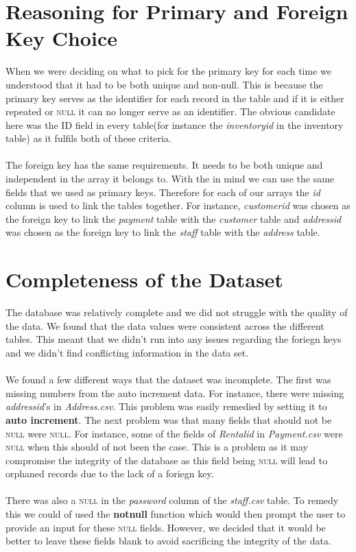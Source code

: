 \documentclass{article}
\begin{document}
\section{Reasoning for Primary and Foreign Key Choice}
	When we were deciding on what to pick for the primary key for each time we understood that it had to be both unique and non-null. 
	This is because the primary key serves as the identifier for each record in the table and if it is either repeated or \textsc{null} it can no longer serve as an identifier. 
	The obvious candidate here was  the ID field in every table(for instance the \emph{inventory\textunderscore id} in the inventory table) as it fulfils both of these criteria.
	\\\\
	The foreign key has the same requirements. It needs to be both unique and independent in the array it belongs to. 
	With the in mind we can use the same fields that we used as primary keys. Therefore for each of our arrays the \emph{id} column is used to link the tables together. 
	For instance, \emph{customer\textunderscore id} was chosen as the foreign key to link the \emph{payment} table with the \emph{customer} table and \emph{address\textunderscore id} 
	was chosen as the foreign key to link the \emph{staff} table with the \emph{address} table.

\section{Completeness of the Dataset}
	The database was relatively complete and we did not struggle with the quality of the data. We found that the data values were consistent across the different tables. This meant
	 that we didn’t run into any issues regarding the foriegn keys and we didn’t find conflicting information in the data set.
	\\\\
	We found a few different ways that the dataset was incomplete. The first was missing numbers from the auto increment data. For instance,
	 there were missing \emph{address\textunderscore id}’s in \emph{Address.csv}. This problem was easily remedied by setting it to \textbf{auto increment}. The next problem was
	 that many fields that should not be \textsc{null} were \textsc{null}. 
	For instance, some of the fields of \emph{Rental\textunderscore id} in \emph{Payment.csv} were \textsc{null} when this should of not been the case. This is a problem as it 
	may compromise the integrity
	 of the database as this field being \textsc{null} will lead to orphaned records due to the lack of a foriegn key.
	\\\\
	There was also a \textsc{null} in the \emph{password} column of the \emph{staff.csv} table. To remedy this we could of used the \textbf{notnull} function which would then 
	prompt the user to provide an input for
	 these \textsc{null} fields. However, we decided that it would be better to leave these fields blank to avoid sacrificing the integrity of the data.
\end{document}
